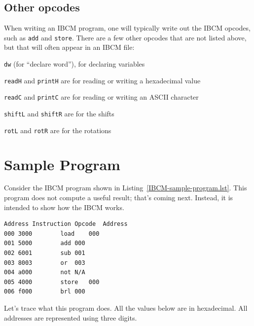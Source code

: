 \subsection{Other opcodes}

When writing an IBCM program, one will typically write out the IBCM
opcodes, such as {\tt add} and {\tt store}.  There are a few other
opcodes that are not listed above, but that will often appear in an
IBCM file:

\begin{itemlist}
\item {\tt dw} (for ``declare word''), for declaring variables
\item {\tt readH} and {\tt printH} are for reading or writing a
  hexadecimal value
\item {\tt readC} and {\tt printC} are for reading or writing an
  ASCII character
\item {\tt shiftL} and {\tt shiftR} are for the shifts
\item {\tt rotL} and {\tt rotR} are for the rotations
\end{itemlist}



\section{Sample Program}

Consider the IBCM program shown in
Listing~\ref{IBCM-sample-program.lst}.  This program does not compute
a useful result; that's coming next.  Instead, it is intended to show
how the IBCM works.

\begin{lstlisting}[caption=Sample IBCM program,backgroundcolor=\color{white},frame=trBL,linewidth=5.5in,xleftmargin=1.75in,label={IBCM-sample-program.lst}]
Address	Instruction	Opcode	Address
000	3000		load	000
001	5000		add	000
002	6001		sub	001
003	8003		or	003
004	a000		not	N/A
005	4000		store	000
006	f000		brl	000
\end{lstlisting}

Let's trace what this program does.  All the values below are in
hexadecimal.  All addresses are represented using three digits.

